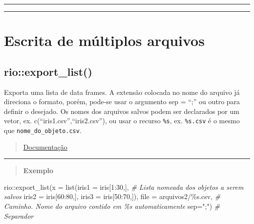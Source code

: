 \documentclass[
]{book}
\newenvironment{Shaded}{\begin{snugshade}}{\end{snugshade}}
\newcommand{\AttributeTok}[1]{\textcolor[rgb]{0.77,0.63,0.00}{#1}}
\newcommand{\CommentTok}[1]{\textcolor[rgb]{0.56,0.35,0.01}{\textit{#1}}}
\newcommand{\DecValTok}[1]{\textcolor[rgb]{0.00,0.00,0.81}{#1}}
\newcommand{\FunctionTok}[1]{\textcolor[rgb]{0.00,0.00,0.00}{#1}}
\newcommand{\NormalTok}[1]{#1}
\newcommand{\SpecialCharTok}[1]{\textcolor[rgb]{0.00,0.00,0.00}{#1}}
\newcommand{\StringTok}[1]{\textcolor[rgb]{0.31,0.60,0.02}{#1}}
\theoremstyle{definition}
\theoremstyle{definition}
\theoremstyle{definition}
\theoremstyle{definition}
\theoremstyle{remark}
\begin{document}
\begin{center}\rule{0.5\linewidth}{0.5pt}\end{center}

\begin{center}\rule{0.5\linewidth}{0.5pt}\end{center}

\hypertarget{escrita-de-muxfaltiplos-arquivos}{%
\section{Escrita de múltiplos arquivos}\label{escrita-de-muxfaltiplos-arquivos}}

\hypertarget{rioexport_list}{%
\subsection{rio::export\_list()}\label{rioexport_list}}

Exporta uma lista de data frames. A extensão colocada no nome do arquivo já direciona o formato, porém, pode-se usar o argumento sep = ``;'' ou outro para definir o desejado. Os nomes dos arquivos salvos podem ser declarados por um vetor, ex. c(``iris1.csv'',``iris2.csv''), ou usar o recurso \texttt{\%s}, ex. \texttt{\%s.csv} é o mesmo que \texttt{nome\_do\_objeto.csv}.

\begin{quote}
\href{https://www.rdocumentation.org/packages/rio/versions/0.5.26/topics/export_list}{Documentação}
\end{quote}

\begin{center}\rule{0.5\linewidth}{0.5pt}\end{center}

\begin{quote}
\textbf{Exemplo}
\end{quote}

\begin{Shaded}
\begin{Highlighting}[]
\NormalTok{rio}\SpecialCharTok{::}\FunctionTok{export\_list}\NormalTok{(}\AttributeTok{x =} \FunctionTok{list}\NormalTok{(}\AttributeTok{iris1 =}\NormalTok{ iris[}\DecValTok{1}\SpecialCharTok{:}\DecValTok{30}\NormalTok{,],   }\CommentTok{\# Lista nomeada dos objetos a serem salvos}
                          \AttributeTok{iris2 =}\NormalTok{ iris[}\DecValTok{60}\SpecialCharTok{:}\DecValTok{80}\NormalTok{,],}
                          \AttributeTok{iris3 =}\NormalTok{ iris[}\DecValTok{50}\SpecialCharTok{:}\DecValTok{70}\NormalTok{,]),}
                 \AttributeTok{file =} \StringTok{\textquotesingle{}arquivos2/\%s.csv\textquotesingle{}}\NormalTok{,      }\CommentTok{\# Caminho. Nome do arquivo contido em \%s automaticamente}
                 \AttributeTok{sep=}\StringTok{";"}\NormalTok{)     }\CommentTok{\# Separador}
\end{Highlighting}
\end{Shaded}
\end{document}
